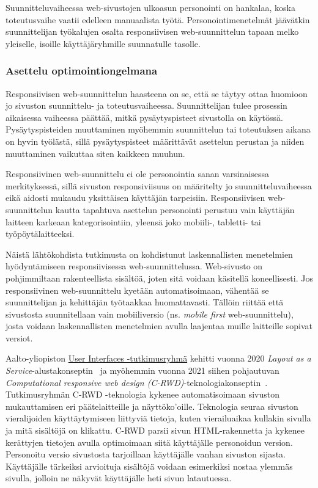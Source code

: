 \documentclass[finnish, 12pt, a4paper, elec, utf8, a-1b, online]{aaltothesis}
\begin{document}
Suunnitteluvaiheessa web-sivustojen ulkoasun personointi on hankalaa, koska
toteutusvaihe vaatii edelleen manuaalista työtä. Personointimenetelmät jäävätkin
suunnittelijan työkalujen osalta responsiivisen web-suunnittelun tapaan melko
yleiselle, isoille käyttäjäryhmille suunnatulle tasolle.

\subsubsection{Asettelu optimointiongelmana}

Responsiivisen web-suunnittelun haasteena on se, että se täytyy ottaa huomioon
jo sivuston suunnittelu- ja toteutusvaiheessa. Suunnittelijan tulee prosessin
aikaisessa vaiheessa päättää, mitkä pysäytyspisteet sivustolla on käytössä.
Pysäytyspisteiden muuttaminen myöhemmin suunnittelun tai toteutuksen aikana on
hyvin työlästä, sillä pysäytyspisteet määrittävät asettelun perustan ja niiden
muuttaminen vaikuttaa siten kaikkeen muuhun.

Responsiivinen web-suunnittelu ei ole personointia sanan varsinaisessa
merkityksessä, sillä sivuston responsiviisuus on määritelty jo
suunnitteluvaiheessa eikä aidosti mukaudu yksittäisen käyttäjän tarpeisiin.
Responsiivisen web-suunnittelun kautta tapahtuva asettelun personointi perustuu
vain käyttäjän laitteen karkeaan kategorisointiin, yleensä joko mobiili-,
tabletti- tai työpöytälaitteeksi.

Näistä lähtökohdista tutkimusta on kohdistunut laskennallisten menetelmien
hyödyntämiseen responsiivisessa web-suunnittelussa. Web-sivusto on
pohjimmiltaan rakenteellista sisältöä, joten sitä voidaan käsitellä
koneellisesti. Jos responsiivinen web-suunnittelu kyetään automatisoimaan,
vähentää se suunnittelijan ja kehittäjän työtaakkaa huomattavasti. Tällöin
riittää että sivustosta suunnitellaan vain mobiiliversio (ns. \textit{mobile
first} web-suunnittelu), josta voidaan laskennallisten menetelmien avulla
laajentaa muille laitteille sopivat versiot.

Aalto-yliopiston \href{https://userinterfaces.aalto.fi/}{User Interfaces
-tutkimusryhmä} kehitti vuonna 2020 \textit{Layout as a
Service}-alustakonseptin~\cite{laine2020_laas} ja myöhemmin vuonna 2021 siihen
pohjautuvan \textit{Computational responsive web design
(C-RWD)}-teknologiakonseptin~\cite{laine2021responsive}. Tutkimusryhmän C-RWD
-teknologia kykenee automatisoimaan sivuston mukauttamisen eri päätelaitteille
ja näyttöko'oille. Teknologia seuraa sivuston vieralijoiden käyttäytymiseen
liittyviä tietoja, kuten vierailuaikaa kullakin sivulla ja mitä sisältöjä on
klikattu. C-RWD parsii sivun HTML-rakennetta ja kykenee kerättyjen tietojen
avulla optimoimaan siitä käyttäjälle personoidun version. Personoitu versio
sivustosta tarjoillaan käyttäjälle vanhan sivuston sijasta. Käyttäjälle
tärkeiksi arvioituja sisältöjä voidaan esimerkiksi nostaa ylemmäs sivulla,
jolloin ne näkyvät käyttäjälle heti sivun latautuessa.
\end{document}
